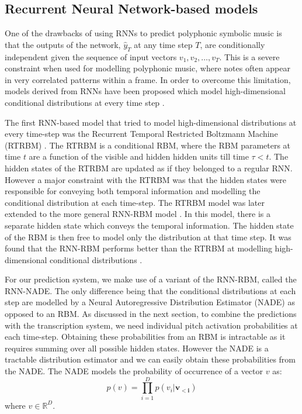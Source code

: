 	\subsection{Recurrent Neural Network-based models}
	\label{subsec:nade}
	One of the drawbacks of using RNNs to predict polyphonic symbolic music is that the outputs of the network, $\hat{y}_T$ at any time step $T$,  are conditionally independent given the sequence of input vectors $v_1, v_2, \ldots, v_T$. This is a severe constraint when used for modelling polyphonic music, where notes often appear in very correlated patterns within a frame. In order to overcome this limitation, models derived from RNNs have been proposed which model high-dimensional conditional distributions at every time step \cite{sutskever2008recurrent,Boulanger-Lewandowski2012}.

	The first RNN-based model that tried to model high-dimensional distributions at every time-step was the Recurrent Temporal Restricted Boltzmann Machine (RTRBM) \cite{sutskever2008recurrent}. The RTRBM is a conditional RBM, where the RBM parameters at time  $t$ are a function of the visible and hidden hidden units till time $\tau < t$. The hidden states of the RTRBM are updated as if they belonged to a regular RNN. However a major constraint with the RTRBM was that the hidden states were responsible for conveying both temporal information and modelling the conditional distribution at each time-step. The RTRBM model was later extended to the more general RNN-RBM model \cite{Boulanger-Lewandowski2012}. In this model, there is a separate hidden state which conveys the temporal information. The hidden state of the RBM is then free to model only the distribution at that time step. It was found that the RNN-RBM performs better than the RTRBM at modelling high-dimensional conditional distributions \cite{Boulanger-Lewandowski2012}. 

	For our prediction system, we make use of a variant of the RNN-RBM, called the RNN-NADE. The only difference being that the conditional distributions at each step are modelled by a Neural Autoregressive Distribution Estimator (NADE) \cite{larochelle2011neural} as opposed to an RBM. As discussed in the next section, to combine the predictions with the transcription system, we need individual pitch activation probabilities at each time-step. Obtaining these probabilities from an RBM is intractable as it requires summing over all possible hidden states. However the NADE is a tractable distribution estimator and we can easily obtain these probabilities from the NADE. The NADE models the probability of occurrence of a vector $v$ as: 
	\begin{equation}
		p(v) = \prod_{i=1}^D p(v_i|\mathbf{v_{<i}})
	\end{equation}
	where $ v \in \mathbb{R}^{D}$.
	
